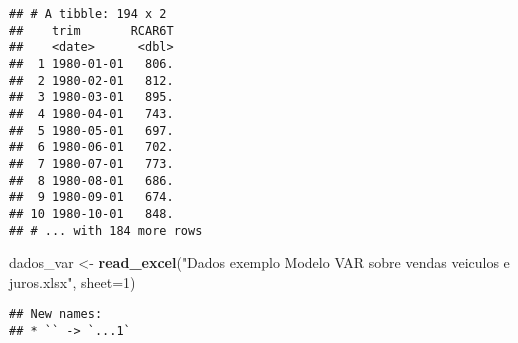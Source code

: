 \documentclass[
]{article}
\newenvironment{Shaded}{\begin{snugshade}}{\end{snugshade}}
\newcommand{\AttributeTok}[1]{\textcolor[rgb]{0.13,0.29,0.53}{#1}}
\newcommand{\DecValTok}[1]{\textcolor[rgb]{0.00,0.00,0.81}{#1}}
\newcommand{\FunctionTok}[1]{\textcolor[rgb]{0.13,0.29,0.53}{\textbf{#1}}}
\newcommand{\NormalTok}[1]{#1}
\newcommand{\OtherTok}[1]{\textcolor[rgb]{0.56,0.35,0.01}{#1}}
\newcommand{\SpecialCharTok}[1]{\textcolor[rgb]{0.81,0.36,0.00}{\textbf{#1}}}
\newcommand{\StringTok}[1]{\textcolor[rgb]{0.31,0.60,0.02}{#1}}
\begin{document}
\begin{Shaded}
\end{Shaded}

\begin{verbatim}
## # A tibble: 194 x 2
##    trim       RCAR6T
##    <date>      <dbl>
##  1 1980-01-01   806.
##  2 1980-02-01   812.
##  3 1980-03-01   895.
##  4 1980-04-01   743.
##  5 1980-05-01   697.
##  6 1980-06-01   702.
##  7 1980-07-01   773.
##  8 1980-08-01   686.
##  9 1980-09-01   674.
## 10 1980-10-01   848.
## # ... with 184 more rows
\end{verbatim}

\begin{Shaded}
\begin{Highlighting}[]
\NormalTok{dados\_var }\OtherTok{\textless{}{-}} \FunctionTok{read\_excel}\NormalTok{(}\StringTok{"Dados exemplo Modelo VAR sobre vendas veiculos e juros.xlsx"}\NormalTok{, }\AttributeTok{sheet=}\DecValTok{1}\NormalTok{)}
\end{Highlighting}
\end{Shaded}

\begin{verbatim}
## New names:
## * `` -> `...1`
\end{verbatim}

\begin{Shaded}
\end{Shaded}
\end{document}
